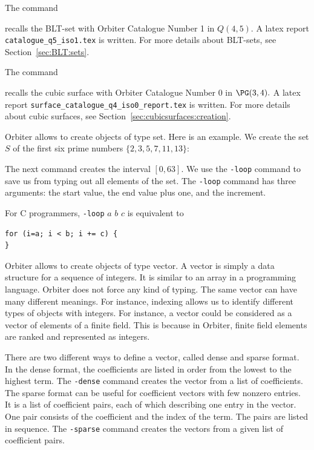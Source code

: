 \bigskip


The command 
{\tt

}
recalls the BLT-set with Orbiter Catalogue Number 1 in $Q(4,5).$
A latex report \verb'catalogue_q5_iso1.tex' is written. 
For more details about BLT-sets, see Section~\ref{sec:BLT:sets}.

\bigskip

The command 
{\tt

}
recalls the cubic surface with Orbiter Catalogue Number 0 in $\PG(3,4).$
A latex report \verb'surface_catalogue_q4_iso0_report.tex' is written. 
For more details about cubic surfaces, see Section~\ref{sec:cubicsurfaces:creation}.


\bigskip


Orbiter allows to create objects of type set. 
Here is an example. We create the set $S$ of the first six prime numbers $\{2,3,5,7,11,13\}$:
{\tt

}
The next command creates the interval $[0,63]$. We use the \verb'-loop' command to 
save us from typing out all elements of the set. The \verb'-loop' command has three arguments:
the start value, the end value plus one, and the increment.
{\tt

}
For C programmers, \verb'-loop' $a$ $b$ $c$ is equivalent to
\begin{verbatim}
for (i=a; i < b; i += c) {
}
\end{verbatim}


Orbiter allows to create objects of type vector.
A vector is simply a data structure for a sequence of integers.
It is similar to an array in a programming language.
Orbiter does not force any kind of typing. 
The same vector can have many different meanings.
For instance, indexing allows us to identify different types of objects with integers. 
For instance, a vector could be considered as a vector of elements of a finite field. 
This is because in Orbiter, finite field elements are ranked and represented as integers. 


\bigskip


There are two different ways to define a vector, called dense and sparse format.
In the dense format, the coefficients are listed in order from the lowest to the highest term.
The \verb'-dense' command creates the vector from a list of coefficients.
The sparse format can be useful for coefficient vectors with few nonzero entries.
It is a list of coefficient pairs, each of which describing one entry in the vector.
One pair consists of the coefficient and the index of the term. The pairs are listed in sequence.
The \verb'-sparse' command creates the vectors from a given list of coefficient pairs. 


